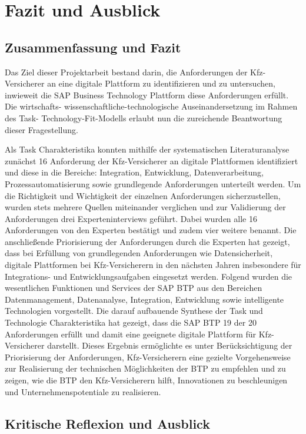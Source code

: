 \chapter{Fazit und Ausblick}

\section{Zusammenfassung und Fazit}

Das Ziel dieser Projektarbeit bestand darin, die Anforderungen der Kfz-Versicherer an eine digitale Plattform zu identifizieren und zu untersuchen, inwieweit die SAP Business Technology Plattform diese Anforderungen erfüllt. Die wirtschafts- wissenschaftliche-technologische Auseinandersetzung im Rahmen des Task- Technology-Fit-Modells erlaubt nun die zureichende Beantwortung dieser Fragestellung.

Als Task Charakteristika konnten mithilfe der systematischen Literaturanalyse zunächst 16 Anforderung der Kfz-Versicherer an digitale Plattformen identifiziert und diese in die Bereiche: Integration, Entwicklung, Datenverarbeitung, Prozessautomatisierung sowie grundlegende Anforderungen unterteilt werden. Um die Richtigkeit und Wichtigkeit der einzelnen Anforderungen sicherzustellen, wurden stets mehrere Quellen miteinander verglichen und zur Validierung der Anforderungen drei Experteninterviews geführt. Dabei wurden alle 16 Anforderungen von den Experten bestätigt und zudem vier weitere benannt. Die anschließende Priorisierung der Anforderungen durch die Experten hat gezeigt, dass bei Erfüllung von grundlegenden Anforderungen wie Datensicherheit, digitale Plattformen bei Kfz-Versicherern in den nächsten Jahren insbesondere für Integrations- und Entwicklungsaufgaben eingesetzt werden. Folgend wurden die wesentlichen Funktionen und Services der SAP BTP aus den Bereichen Datenmanagement, Datenanalyse, Integration, Entwicklung sowie intelligente Technologien vorgestellt. Die darauf aufbauende Synthese der Task und Technologie Charakteristika hat gezeigt, dass die SAP BTP 19 der 20 Anforderungen erfüllt und damit eine geeignete digitale Plattform für Kfz-Versicherer darstellt. Dieses Ergebnis ermöglichte es unter Berücksichtigung der Priorisierung der Anforderungen, Kfz-Versicherern eine gezielte Vorgehensweise zur Realisierung der technischen Möglichkeiten der BTP zu empfehlen und zu zeigen, wie die BTP den Kfz-Versicherern hilft, Innovationen zu beschleunigen und Unternehmenspotentiale zu realisieren.

\newpage
\section{Kritische Reflexion und Ausblick}


